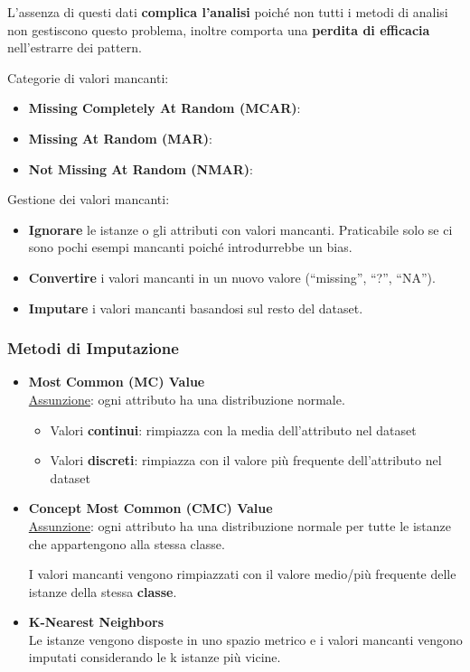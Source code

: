 L'assenza di questi dati \textbf{complica l'analisi} poiché non tutti i metodi di analisi non gestiscono questo problema, 
inoltre comporta una \textbf{perdita di efficacia} nell'estrarre dei pattern.

Categorie di valori mancanti:
\begin{itemize}
  \item \textbf{Missing Completely At Random (MCAR)}:
  \item \textbf{Missing At Random (MAR)}:
  \item \textbf{Not Missing At Random (NMAR)}:
\end{itemize}

Gestione dei valori mancanti:
\begin{itemize}
  \item \textbf{Ignorare} le istanze o gli attributi con valori mancanti. 
  Praticabile solo se ci sono pochi esempi mancanti poiché introdurrebbe un bias.
  \item \textbf{Convertire} i valori mancanti in un nuovo valore (``missing'', ``?'', ``NA'').
  \item \textbf{Imputare} i valori mancanti basandosi sul resto del dataset. 
\end{itemize}

\subsubsection*{Metodi di Imputazione}
\begin{itemize}
  \item \textbf{Most Common (MC) Value}\\
  \underline{Assunzione}: ogni attributo ha una distribuzione normale.
  \begin{itemize}
    \item Valori \textbf{continui}: rimpiazza con la media dell'attributo nel dataset
    \item Valori \textbf{discreti}: rimpiazza con il valore più frequente dell'attributo nel dataset
  \end{itemize}

  \item \textbf{Concept Most Common (CMC) Value}\\
  \underline{Assunzione}: ogni attributo ha una distribuzione normale per tutte le istanze che appartengono alla stessa classe.

  I valori mancanti vengono rimpiazzati con il valore medio/più frequente delle istanze della stessa \textbf{classe}. 

  \item \textbf{K-Nearest Neighbors}\\
  Le istanze vengono disposte in uno spazio metrico e i valori mancanti vengono imputati considerando le k
istanze più vicine.
\end{itemize}

